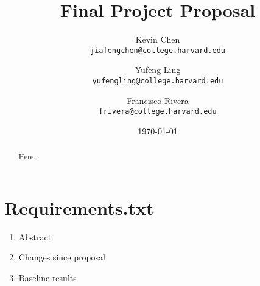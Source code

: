 \documentclass[10pt]{article}
\begin{document}
\title{Final Project Proposal}
\author{
Kevin Chen              \\ \texttt{jiafengchen@college.harvard.edu}
\and Yufeng Ling        \\ \texttt{yufengling@college.harvard.edu}
\and Francisco Rivera   \\ \texttt{frivera@college.harvard.edu}}
\date{\today}

\maketitle

\begin{abstract}
Here.
\end{abstract}

\section{Requirements.txt}

\begin{enumerate}
\item Abstract
\item Changes since proposal
\item Baseline results
\end{enumerate}
\end{document}

